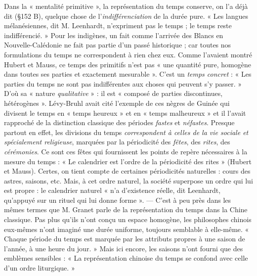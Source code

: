 \vspace{0.24cm}
{\footnotesize Dans la « mentalité primitive », la représentation du temps conserve, on
l'a déjà dit (\S 152 B), quelque chose de l’\textsf{\textit {indifférenciation}} de la durée pure.
« Les langues mélanésiennes, dit M. Leenhardt, n'expriment pas le temps ;
le temps reste indifférencié. » Pour les indigènes, un fait comme l'arrivée
des Blancs en Nouvelle-Calédonie ne fait pas partie d’un passé historique ;
car toutes nos formulations du temps ne correspondent à rien chez eux.
Comme l'avaient montré Hubert et Mauss, ce temps des primitifs n’est
pas « une quantité pure, homogène dans toutes ses parties et exactement
mesurable ». C’est un \textsf{\textit {temps concret}} : « Les parties du temps ne sont pas indifférentes
aux choses qui peuvent s’y passer. » D'où sa « nature {\it qualitative} » :
il est « composé de parties discontinues, hétérogènes ». Lévy-Bruhl avait
cité l'exemple de ces nègres de Guinée qui divisent le temps en « temps
heureux » et en « temps malheureux » et il l'avait rapproché de la distinction
classique des périodes {\it fastes} et {\it néfastes}. Presque partout en effet, les divisions
du temps \textsf{\textit {correspondent à celles de la vie sociale et spécialement religieuse}},
marquées par la périodicité des {\it fêtes}, des {\it rites}, des {\it cérémonies}. Ce sont ces fêtes
qui fournissent les points de repère nécessaires à la mesure du temps :
« Le calendrier est l’ordre de la périodicité des rites » (Hubert et Mauss).
Certes, on tient compte de certaines périodicités naturelles : cours des astres,
saisons, etc. Mais, à cet ordre naturel, la société superpose un ordre qui lui
est propre : le calendrier naturel « n’a d’existence réelle, dit Leenhardt,
qu’appuyé sur un rituel qui lui donne forme ». — C’est à peu près dans les
mêmes termes que M. Granet parle de la représentation du temps dans la
Chine classique. Pas plus qu’ils n’ont conçu un espace homogène, les philosophes
chinois eux-mêmes n’ont imaginé une durée uniforme, toujours
semblable à elle-même. « Chaque période du temps est marquée par les
attributs propres à une saison de l’année, à une heure du jour. » Mais ici
encore, les saisons n’ont fourni que des emblèmes sensibles : « La représentation
chinoise du temps se confond avec celle d’un ordre liturgique. »

}
